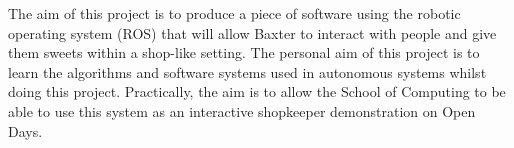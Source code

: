 The aim of this project is to produce a piece of software using the robotic operating system (ROS) that will allow Baxter to interact with people and give them sweets within a shop-like setting. The personal aim of this project is to learn the algorithms and software systems used in autonomous systems whilst doing this project. Practically, the aim is to allow the School of Computing to be able to use this system as an interactive shopkeeper demonstration on Open Days.